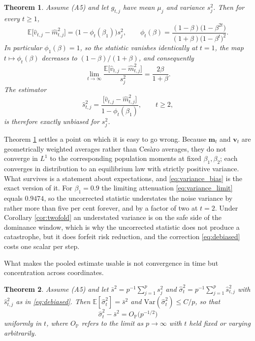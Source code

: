 \documentclass[pdflatex,sn-mathphys-num]{sn-jnl}%
\theoremstyle{thmstyleone}%
\newtheorem{theorem}{Theorem}%
\theoremstyle{thmstyletwo}%
\theoremstyle{thmstylethree}%
\newcommand{\Var}{\mathrm{Var}}
\newcommand{\E}{\mathbb{E}}
\begin{document}
\begin{theorem}
\label{thm:variance_bias}
Assume (A5) and let $g_{t,j}$ have mean $\mu_j$ and variance $s^2_j$. Then for every $t\ge1$,
\begin{equation}
\label{eq:variance_bias}
\E\bigl[\hat v_{t,j}-\hat m^2_{t,j}\bigr]=\bigl(1-\phi_t(\beta_1)\bigr)s^2_j,
\qquad
\phi_t(\beta)=\frac{(1-\beta)\bigl(1-\beta^{2t}\bigr)}{(1+\beta)\bigl(1-\beta^{t}\bigr)^{2}} .
\end{equation}
In particular $\phi_1(\beta)=1$, so the statistic vanishes identically at $t=1$, the map $t\mapsto\phi_t(\beta)$ decreases to $(1-\beta)/(1+\beta)$, and consequently
\begin{equation}
\label{eq:variance_limit}
\lim_{t\to\infty}\frac{\E\bigl[\hat v_{t,j}-\hat m^2_{t,j}\bigr]}{s^2_j}=\frac{2\beta}{1+\beta} .
\end{equation}
The estimator
\begin{equation}
\label{eq:debiased}
\hat s^2_{t,j}=\frac{\bigl[\hat v_{t,j}-\hat m^2_{t,j}\bigr]}{1-\phi_t(\beta_1)},
\qquad t\ge2,
\end{equation}
is therefore exactly unbiased for $s^2_j$.
\end{theorem}

Theorem \ref{thm:variance_bias} settles a point on which it is easy to go wrong. Because $\bm m_t$ and $\bm v_t$ are geometrically weighted averages rather than Ces\`aro averages, they do not converge in $L^1$ to the corresponding population moments at fixed $\beta_1,\beta_2$; each converges in distribution to an equilibrium law with strictly positive variance. What survives is a statement about expectations, and \eqref{eq:variance_bias} is the exact version of it. For $\beta_1=0.9$ the limiting attenuation \eqref{eq:variance_limit} equals $0.9474$, so the uncorrected statistic understates the noise variance by rather more than five per cent forever, and by a factor of two at $t=2$. Under Corollary \ref{cor:twofold} an understated variance is on the safe side of the dominance window, which is why the uncorrected statistic does not produce a catastrophe, but it does forfeit risk reduction, and the correction \eqref{eq:debiased} costs one scalar per step.

What makes the pooled estimate usable is not convergence in time but concentration across coordinates.

\begin{theorem}
\label{thm:concentration}
Assume (A5) and let $\bar s^2=p^{-1}\sum_{j=1}^{p}s^2_j$ and $\hat\sigma^2_t=p^{-1}\sum_{j=1}^{p}\hat s^2_{t,j}$ with $\hat s^2_{t,j}$ as in \eqref{eq:debiased}. Then $\E[\hat\sigma^2_t]=\bar s^2$ and $\Var(\hat\sigma^2_t)\le C/p$, so that
\begin{equation}
\hat\sigma^2_t-\bar s^2=O_{\mathbb P}\bigl(p^{-1/2}\bigr)
\end{equation}
uniformly in $t$, where $O_{\mathbb P}$ refers to the limit as $p\to\infty$ with $t$ held fixed or varying arbitrarily.
\end{theorem}
\end{document}

